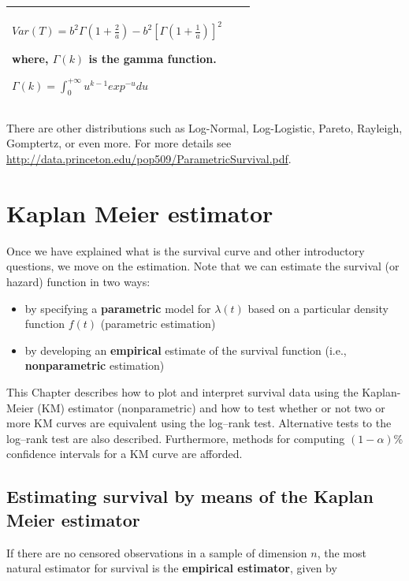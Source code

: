 \documentclass[]{book}
\theoremstyle{definition}
\theoremstyle{definition}
\theoremstyle{definition}
\theoremstyle{remark}
\begin{document}
\begin{longtable}[]{@{}lll@{}}
\begin{minipage}[t]{0.32\columnwidth}
\(Var(T) = b^2 \Gamma \left(1+  \frac{2}{a}\right) - b^2  \left [ \Gamma \left(1+  \frac{1}{a}\right)\right]^2\)

where, \(\Gamma(k)\) is the gamma function.

\(\Gamma (k) = \int_0^{+\infty} u^{k-1} exp^{-u}du\)\strut
\end{minipage}\tabularnewline
\bottomrule
\end{longtable}

There are other distributions such as Log-Normal, Log-Logistic, Pareto,
Rayleigh, Gomptertz, or even more. For more details see
\url{http://data.princeton.edu/pop509/ParametricSurvival.pdf}.

\chapter{Kaplan Meier estimator}\label{km}

Once we have explained what is the survival curve and other introductory
questions, we move on the estimation. Note that we can estimate the
survival (or hazard) function in two ways:

\begin{itemize}
\item
  by specifying a \textbf{parametric} model for \(\lambda(t)\) based on
  a particular density function \(f(t)\) (parametric estimation)
\item
  by developing an \textbf{empirical} estimate of the survival function
  (i.e., \textbf{nonparametric} estimation)
\end{itemize}

This Chapter describes how to plot and interpret survival data using the
Kaplan-Meier (KM) estimator (nonparametric) and how to test whether or
not two or more KM curves are equivalent using the log--rank test.
Alternative tests to the log--rank test are also described. Furthermore,
methods for computing \((1-\alpha)\)\% confidence intervals for a KM
curve are afforded.

\section{Estimating survival by means of the Kaplan Meier
estimator}\label{estimating-survival-by-means-of-the-kaplan-meier-estimator}

If there are no censored observations in a sample of dimension \(n\),
the most natural estimator for survival is the \textbf{empirical
estimator}, given by
\end{document}
